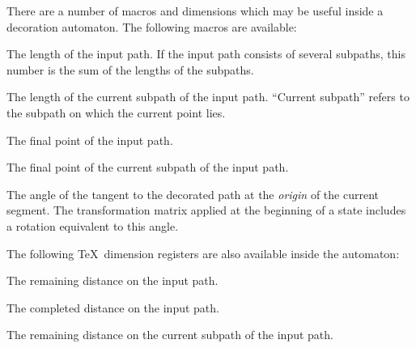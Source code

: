 \begin{command}{\pgfdeclaredecoration{}}
\begin{command}{\state{}}
    There are a number of macros and dimensions which may be useful
    inside a decoration automaton. The following macros are available:
    
    \begin{command}{\pgfdecoratedpathlength}
      The length of the input path. If the input path consists of
      several subpaths, this number is the sum of the lengths of the
      subpaths. 
    \end{command}
    
    \begin{command}{\pgfdecoratedsubpathlength}
      The length of the current subpath of the input path. ``Current
      subpath''  refers to the subpath on which the current point
      lies. 
    \end{command}
		
    \begin{command}{\pgfpointdecoratedpathlast}
      The final point of the input path.
    \end{command}
    
    \begin{command}{\pgfpointdecoratedsubpathlast}
      The final point of the current subpath of the input path.
    \end{command}
		
    \begin{command}{\pgfdecoratedangle}
      The angle of the tangent to the decorated path at the \emph{origin}
      of the current segment. The transformation matrix applied at 
      the beginning of a state includes a rotation equivalent to 
      this angle.
    \end{command}
		
    The following \TeX\ dimension registers are also available inside the 
    automaton:
    
    \begin{command}{\pgfdecoratedremainingdistance}
      The remaining distance on the input path.
    \end{command}
		
    \begin{command}{\pgfdecoratedcompleteddistance}
      The completed distance on the input path.
    \end{command}
    
    \begin{command}{\pgfdecoratedsubpathremainingdistance}
      The remaining distance on the current subpath of the input path.
    \end{command}
    

\end{command}
\end{command}
